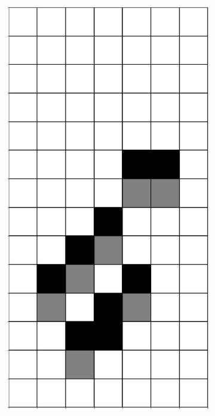 \documentclass[12pt]{article}
\numberwithin{figure}{section} %
\begin{document}
\begin{figure}[H]
\begin{subfigure}{0.18\textwidth}
     		\includegraphics[width=\linewidth]{Section4/15.0}
     		\subcaption{}
   	\end{subfigure}
     	\begin{subfigure}{0.18\textwidth}
     		\centering

\end{subfigure}
\end{figure}
\end{document}
